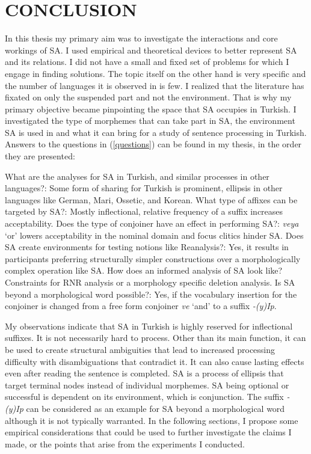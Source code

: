 \chapter{\MakeUppercase{conclusion}}

In this thesis my primary aim was to investigate the interactions and core workings of SA. I used empirical and theoretical devices to better represent SA and its relations. I did not have a small and fixed set of problems for which I engage in finding solutions. The topic itself on the other hand is very specific and the number of languages it is observed in is few. I realized that the literature has fixated on only the suspended part and not the environment. That is why my primary objective became pinpointing the space that SA occupies in Turkish. I investigated the type of morphemes that can take part in SA, the environment SA is used in and what it can bring for a study of sentence processing in Turkish. Answers to the questions in (\ref{questions}) can be found in my thesis, in the order they are presented:

\begin{exe}
\ex \label{questions}
\begin{xlisti}
    \ex What are the analyses for SA in Turkish, and similar processes in other languages?: Some form of sharing for Turkish is prominent, ellipsis in other languages like German, Mari, Ossetic, and Korean.
    \ex What type of affixes can be targeted by SA?: Mostly inflectional, relative frequency of a suffix increases acceptability.
    \ex Does the type of conjoiner have an effect in performing SA?: \textit{veya} `or' lowers acceptability in the nominal domain and focus clitics hinder SA.
    \ex Does SA create environments for testing notions like Reanalysis?: Yes, it results in participants preferring structurally simpler constructions over a morphologically complex operation like SA.
    \ex How does an informed analysis of SA look like? Constraints for RNR analysis or a morphology specific deletion analysis.
    \ex Is SA beyond a morphological word possible?: Yes, if the vocabulary insertion for the conjoiner is changed from a free form conjoiner \textit{ve} `and' to a suffix \textit{-(y)Ip}.  
\end{xlisti}
\end{exe}

My observations indicate that SA in Turkish is highly reserved for inflectional suffixes. It is not necessarily hard to process. Other than its main function, it can be used to create structural ambiguities that lead to increased processing difficulty with disambiguations that contradict it. It can also cause lasting effects even after reading the sentence is completed. SA is a process of ellipsis that target terminal nodes instead of individual morphemes. SA being optional or successful is dependent on its environment, which is conjunction. The suffix \textit{-(y)Ip} can be considered as an example for SA beyond a morphological word although it is not typically warranted. In the following sections, I propose some empirical considerations that could be used to further investigate the claims I made, or the points that arise from the experiments I conducted.


